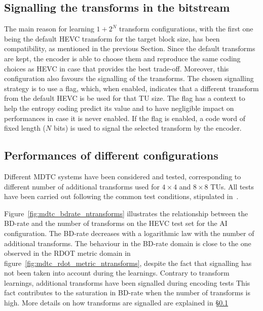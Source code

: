 \documentclass[11pt,a4paper,openright,twoside]{book}
\numberwithin{equation}{section} %
\numberwithin{figure}{section} %
\numberwithin{table}{section} %
\begin{document}
\subsection{Signalling the transforms in the bitstream}
\label{sub:mdtc_signalling}

The main reason for learning $1+2^N$ transform configurations, with the first
one being the default \ac{HEVC} transform for the target block size, has been
compatibility, as mentioned in the previous Section.
Since the default transforms are kept, the encoder is able to choose them and
reproduce the same coding choices as \ac{HEVC} in case that provides the best
trade-off.
Moreover, this configuration also favours the signalling of the transforms.
The chosen signalling strategy is to use a flag, which, when enabled,
indicates that a different transform from the default \ac{HEVC} is be used for
that \ac{TU} size.
The flag has a context to help the entropy coding predict its value and to
have negligible impact on performances in case it is never enabled.
If the flag is enabled, a code word of fixed length ($N$ bits) is used to
signal the selected transform by the encoder.

\subsection{Performances of different configurations}
\label{sub:mdtc_performances}

Different \ac{MDTC} systems have been considered and tested, corresponding to
different number of additional transforms used for $4\times4$ and $8\times8$
\acp{TU}.
All tests have been carried out following the common test conditions,
stipulated in~\cite{bossen-12-common-test-conditions}.

Figure~\ref{fig:mdtc_bdrate_ntransforms} illustrates the relationship between
the \ac{BD}-rate and the number of transforms on the \ac{HEVC} test set for
the \ac{AI} configuration.
The \ac{BD}-rate decreases with a logarithmic law with the number of
additional transforms.
The behaviour in the \ac{BD}-rate domain is close to the one observed in the
\ac{RDOT} metric domain in figure~\ref{fig:mdtc_rdot_metric_ntransforms},
despite the fact that signalling has not been taken into account during the
learnings.
Contrary to transform learnings, additional transforms have been
signalled during encoding tests
This fact contributes to the saturation in \ac{BD}-rate when the number of
transforms is high.
More details on how transforms are signalled are explained in
\S\ref{sub:mdtc_signalling}
\end{document}
